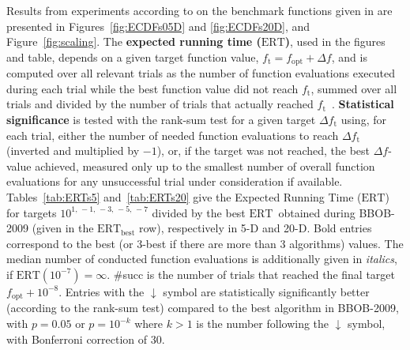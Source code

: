 \documentclass{sig-alternate}
\newcommand{\ERT}{\ensuremath{\mathrm{ERT}}}
\newcommand{\Df}{\ensuremath{\Delta f}}
\newcommand{\fopt}{\ensuremath{f_\mathrm{opt}}}
\newcommand{\ftarget}{\ensuremath{f_\mathrm{t}}}
\begin{document}
Results from experiments according to \cite{hansen2012exp} on the benchmark
functions given in \cite{wp200902_2010,hansen2012noi} are presented in 
Figures~\ref{fig:ECDFs05D} and \ref{fig:ECDFs20D}, and Figure~\ref{fig:scaling}.
The \textbf{expected running time (\ERT)}, used in the figures and table,
depends on a given target function value, $\ftarget=\fopt+\Df$, and is computed
over all relevant trials as the number of function evaluations executed during
each trial while the best function value did not reach \ftarget, summed over
all trials and divided by the number of trials that actually reached \ftarget\
\cite{hansen2012exp,price1997dev}.
\textbf{Statistical significance} is tested with the rank-sum test for a given
target $\Delta\ftarget$ using, for each trial, either the number of needed
function evaluations to reach $\Delta\ftarget$ (inverted and multiplied by
$-1$), or, if the target was not reached, the best $\Df$-value achieved,
measured only up to the smallest number of overall function evaluations for any
unsuccessful trial under consideration if available.
Tables~\ref{tab:ERTs5} and~\ref{tab:ERTs20} give the Expected Running Time (\ERT) for targets
$10^{1,\,-1,\,-3,\,-5,\,-7}$ divided by the best \ERT\ obtained during
BBOB-2009 (given in the \ERT$_{\text{best}}$ row), respectively in 5-D
and 20-D.
Bold entries correspond to the best (or 3-best if there are more than 3
algorithms) values.
The median number of conducted function evaluations is additionally given in
\textit{italics}, if $\ERT(10^{-7}) =\infty$.
\#succ is the number of trials that reached the final target $\fopt + 10^{-8}$.
Entries with the $\downarrow$ symbol are statistically significantly better 
(according to the rank-sum test) compared to the best algorithm in BBOB-2009,
with $p=0.05$ or $p=10^{-k}$ where $k>1$ is the number
following the $\downarrow$ symbol, with Bonferroni correction of 30.
\end{document}
